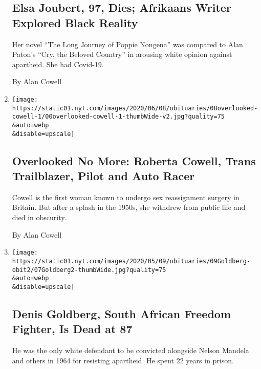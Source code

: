 \begin{enumerate}
  \hypertarget{elsa-joubert-97-dies-afrikaans-writer-explored-black-reality}{%
  \subsection{Elsa Joubert, 97, Dies; Afrikaans Writer Explored Black
  Reality}\label{elsa-joubert-97-dies-afrikaans-writer-explored-black-reality}}

  Her novel ``The Long Journey of Poppie Nongena'' was compared to Alan
  Paton's ``Cry, the Beloved Country'' in arousing white opinion against
  apartheid. She had Covid-19.

  By Alan Cowell
\item
  \href{/2020/06/05/obituaries/roberta-cowell-overlooked.html}{}

  \texttt{[image: https://static01.nyt.com/images/2020/06/08/obituaries/08overlooked-cowell-1/00overlooked-cowell-1-thumbWide-v2.jpg?quality=75\\\&auto=webp\\\&disable=upscale]}

  \hypertarget{overlooked-no-more-roberta-cowell-trans-trailblazer-pilot-and-auto-racer}{%
  \subsection{Overlooked No More: Roberta Cowell, Trans Trailblazer,
  Pilot and Auto
  Racer}\label{overlooked-no-more-roberta-cowell-trans-trailblazer-pilot-and-auto-racer}}

  Cowell is the first woman known to undergo sex reassignment surgery in
  Britain. But after a splash in the 1950s, she withdrew from public
  life and died in obscurity.

  By Alan Cowell
\item
  \href{/2020/05/08/world/africa/denis-goldberg-dead.html}{}

  \texttt{[image: https://static01.nyt.com/images/2020/05/09/obituaries/09Goldberg-obit2/07Goldberg2-thumbWide.jpg?quality=75\\\&auto=webp\\\&disable=upscale]}

  \hypertarget{denis-goldberg-south-african-freedom-fighter-is-dead-at-87}{%
  \subsection{Denis Goldberg, South African Freedom Fighter, Is Dead at
  87}\label{denis-goldberg-south-african-freedom-fighter-is-dead-at-87}}

  He was the only white defendant to be convicted alongside Nelson
  Mandela and others in 1964 for resisting apartheid. He spent 22 years
  in prison.


\end{enumerate}
